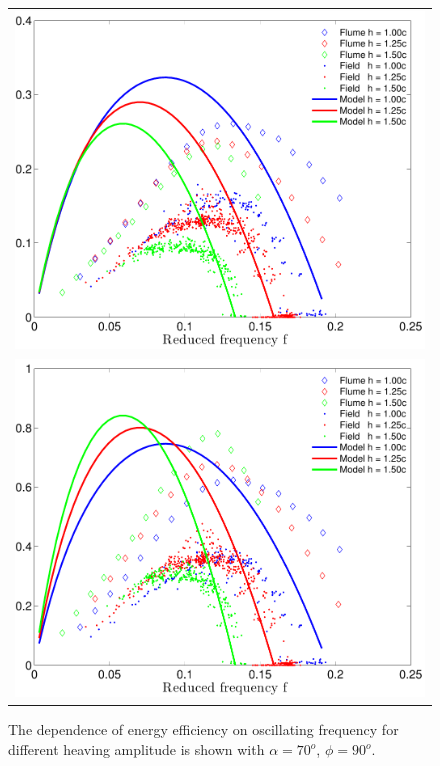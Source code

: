 \begin{figure}
\begin{center}
\begin{tabular}{c}
\includegraphics[width=12cm]{./Figures/theodorsen/Strouhal_vs_Efficiency.pdf} \\
\includegraphics[width=12cm]{./Figures/theodorsen/Strouhal_vs_Cp.pdf}
\end{tabular}
\end{center}
\caption[The optimal energy efficiency for different stroke frequencies]{The dependence of energy efficiency on oscillating frequency for different heaving amplitude is shown with $\alpha = 70^o$, $\phi = 90^o$. }
\label{fig:Strouhal}
\end{figure}


